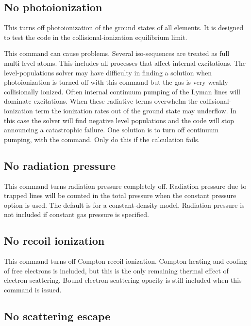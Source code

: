 \subsection{No photoionization}

This turns off photoionization of the ground states of all elements.
It is designed to test the code in the collisional-ionization equilibrium
limit.

This command can cause problems.
Several iso-sequences are treated as
full multi-level atoms.
This includes all processes that affect internal
excitations.
The level-populations solver may have difficulty in finding
a solution when photoionization is turned off with this command but the
gas is very weakly collisionally ionized.
Often internal continuum pumping
of the Lyman lines will dominate excitations.
When these radiative terms
overwhelm the collisional-ionization term the ionization rates out of the
ground state may underflow.
In this case the solver will find negative
level populations and the code will stop announcing a
catastrophic failure.
One solution is to turn off continuum pumping,
with the  command.
Only do this if the calculation fails.

\subsection{No radiation pressure}

This command turns radiation pressure completely off.
Radiation pressure
due to trapped lines will be counted in the total pressure when
the constant pressure option is used.
The default is for a constant-density model.
Radiation pressure is not included if constant gas pressure is specified.

\subsection{No recoil ionization}

This command turns off Compton recoil ionization.
Compton heating and
cooling of free electrons is included,
but this is the only remaining thermal
effect of electron scattering.
Bound-electron scattering opacity is still
included when this command is issued.

\subsection{No scattering escape}

